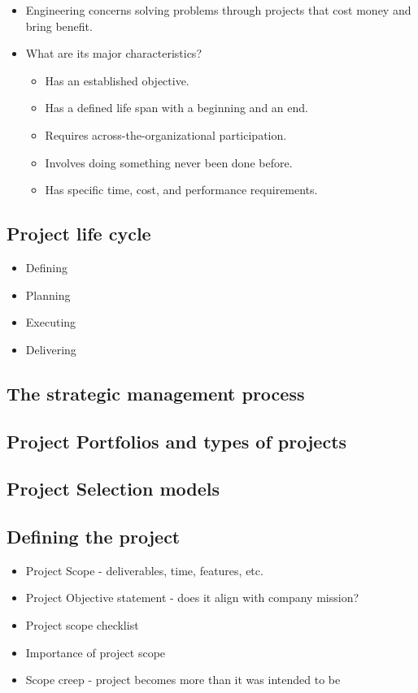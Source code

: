 \documentclass{article}[8pt]
\begin{document}
\begin{multicols}{2}
\begin{itemize}
        \item Engineering concerns solving problems through projects that cost money and bring benefit.
        \item What are its major characteristics?
            \begin{itemize}
                \item Has an established objective.
                \item Has a defined life span with a beginning and an end.
                \item Requires across-the-organizational participation.
                \item Involves doing something never been done before.
                \item Has specific time, cost, and performance requirements.
            \end{itemize}
    \end{itemize}

    \subsection{Project life cycle}
    \begin{itemize}
        \item Defining
        \item Planning
        \item Executing
        \item Delivering
    \end{itemize}

    \subsection{The strategic management process}

    \subsection{Project Portfolios and types of projects}

    \subsection{Project Selection models}

    \subsection{Defining the project}
    \begin{itemize}
        \item Project Scope - deliverables, time, features, etc.
        \item Project Objective statement - does it align with company mission?
        \item Project scope checklist
        \item Importance of project scope
        \item Scope creep - project becomes more than it was intended to be


\end{itemize}
\end{multicols}
\end{document}
